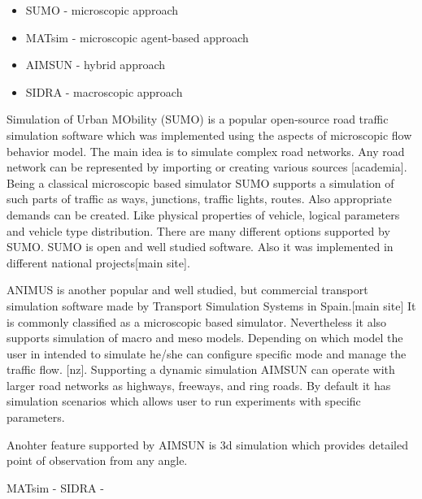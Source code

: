\begin{itemize}
    \item SUMO -  microscopic approach
    \item MATsim - microscopic agent-based approach
    \item AIMSUN - hybrid approach
    \item SIDRA - macroscopic approach
\end{itemize}

Simulation of Urban MObility (SUMO) is a popular open-source road traffic simulation software which was implemented using the aspects of microscopic flow behavior model.
The main idea is to simulate complex road networks. Any road network can be represented by importing or creating various sources [academia].
Being a classical microscopic based simulator SUMO supports a simulation of such parts of traffic as ways, junctions, traffic lights, routes.
Also appropriate demands can be created. Like physical properties of vehicle, logical parameters and vehicle type distribution.
There are many different options supported by SUMO.
SUMO is open and well studied software. Also it was implemented in different national projects[main site].

ANIMUS is another popular and well studied, but commercial
transport simulation software made by Transport Simulation Systems in Spain.[main site]
It is commonly classified as a microscopic based simulator. Nevertheless it also supports simulation of macro and meso models.
Depending on which model the user in intended to simulate he/she can configure specific mode and manage the traffic flow. [nz].
Supporting a dynamic simulation AIMSUN can operate with larger road networks as highways, freeways, and ring roads.
By default it has simulation scenarios which allows user to run experiments with specific parameters.

Anohter feature  supported by AIMSUN is 3d simulation which provides detailed point of observation from any angle.

 MATsim -
 SIDRA -


